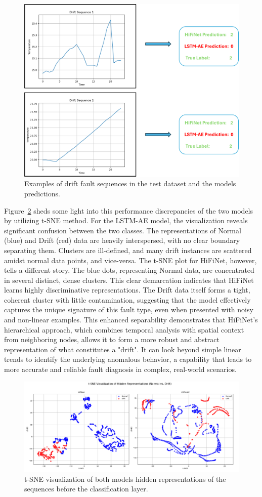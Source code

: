 \begin{figure}
  \centering
  \includegraphics[width=\linewidth]{images/classifications.png}
  \caption{Examples of drift fault sequences in the test dataset and the models predictions.}
  \label{fig:classifications}
\end{figure}

Figure~\ref{fig:tsne} sheds some light into this performance discrepancies of the two models by utilizing t-SNE method. For the LSTM-AE model, the visualization reveals significant confusion between the two classes. The representations of Normal (blue) and Drift (red) data are heavily interspersed, with no clear boundary separating them. Clusters are ill-defined, and many drift instances are scattered amidst normal data points, and vice-versa. The t-SNE plot for HiFiNet, however, tells a different story. The blue dots, representing Normal data, are concentrated in several distinct, dense clusters. This clear demarcation indicates that HiFiNet learns highly discriminative representations. The Drift data itself forms a tight, coherent cluster with little contamination, suggesting that the model effectively captures the unique signature of this fault type, even when presented with noisy and non-linear examples. This enhanced separability demonstrates that HiFiNet's hierarchical approach, which combines temporal analysis with spatial context from neighboring nodes, allows it to form a more robust and abstract representation of what constitutes a "drift". It can look beyond simple linear trends to identify the underlying anomalous behavior, a capability that leads to more accurate and reliable fault diagnosis in complex, real-world scenarios.

\begin{figure}
  \centering
  \includegraphics[width=\linewidth]{images/tsne.png}
  \caption{t-SNE visualization of both models hidden representations of the sequences before the classification layer.}
  \label{fig:tsne}
\end{figure}
